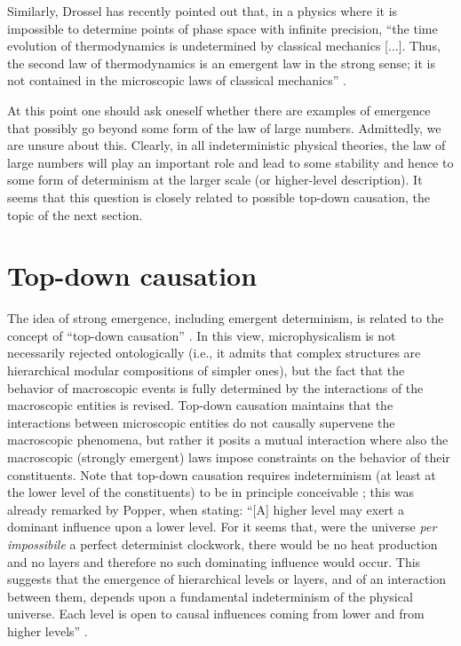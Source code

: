 \documentclass[aps,prl,twocolumn,showpacs,superscriptaddress,groupedaddress, nofootinbib]{revtex4-1}
\begin{document}
Similarly, Drossel has recently pointed out that, in a physics where it is impossible to determine points of phase space with infinite precision, ``the time evolution of thermodynamics is undetermined by classical mechanics [...]. Thus, the second law of thermodynamics is an emergent law in the strong sense; it is not contained in the microscopic laws of classical mechanics'' \cite{drossel}.


At this point one should ask oneself whether there are examples of emergence that possibly go beyond some form of the law of large numbers. Admittedly, we are unsure about this. Clearly, in all indeterministic physical theories, the law of large numbers will play an important role and lead to some stability and hence to some form of determinism at the larger scale (or higher-level description). It seems that this question is closely related to possible top-down causation, the topic of the next section.


\section{Top-down causation}
The idea of strong emergence, including emergent determinism, is related to the concept of ``top-down causation'' \cite{topdown, topdown2}. In this view, microphysicalism is not necessarily rejected ontologically (i.e., it admits that complex structures are hierarchical modular compositions of simpler ones), but the fact that the behavior of macroscopic events is fully determined by the interactions of the macroscopic entities is revised.  Top-down causation maintains that the interactions between microscopic entities do not causally supervene the macroscopic phenomena, but rather it posits a mutual interaction where also the macroscopic (strongly emergent) laws impose constraints on the behavior of their constituents. Note that top-down causation requires indeterminism (at least at the lower level of the constituents) to be in principle conceivable \cite{drosselnew}; this was already remarked by Popper, when stating: ``{[A] higher level may exert a dominant influence upon a lower level}. For it seems that, were the universe \emph{per impossibile} a perfect determinist clockwork, there would be no heat production and no layers and therefore no such dominating influence would occur. This suggests that the emergence of hierarchical levels or layers, and of an interaction between them, depends upon a fundamental indeterminism of the physical universe. Each level is open to causal influences coming from lower and from higher levels'' \cite{poppernew}.
\end{document}
